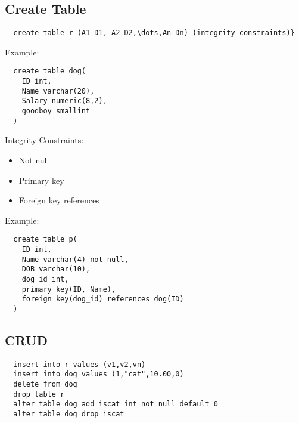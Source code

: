 \documentclass{math}
\begin{document}
\subsection*{Create Table}
\begin{lstlisting}
  create table r (A1 D1, A2 D2,\dots,An Dn) (integrity constraints)}
\end{lstlisting}
Example:
\begin{lstlisting}
  create table dog(
    ID int,
    Name varchar(20),
    Salary numeric(8,2),
    goodboy smallint
  )
\end{lstlisting}
Integrity Constraints:
\begin{itemize}
  \item Not null
  \item Primary key
  \item Foreign key references
\end{itemize}
Example:
\begin{lstlisting}
  create table p(
    ID int,
    Name varchar(4) not null,
    DOB varchar(10),
    dog_id int,
    primary key(ID, Name),
    foreign key(dog_id) references dog(ID)
  )
\end{lstlisting}

\subsection*{CRUD}
\begin{lstlisting}
  insert into r values (v1,v2,vn)
  insert into dog values (1,"cat",10.00,0)
  delete from dog
  drop table r
  alter table dog add iscat int not null default 0
  alter table dog drop iscat
\end{lstlisting}
\end{document}
